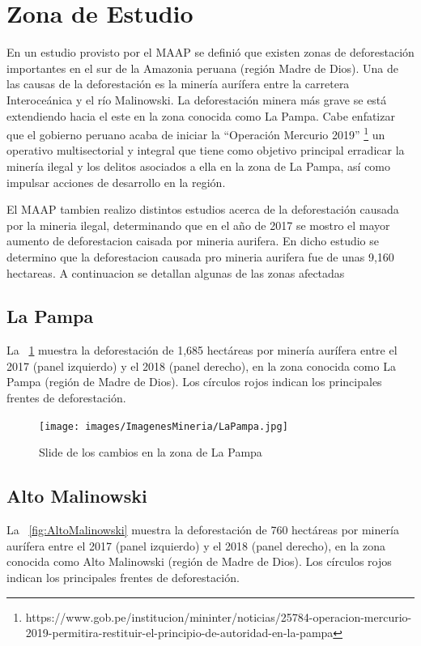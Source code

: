 \section{Zona de Estudio}
En un estudio provisto por el \gls{MAAP} se definió que existen zonas de deforestación importantes en el sur de la Amazonia peruana (región Madre de Dios). Una de las causas de la deforestación es la minería aurífera entre la carretera Interoceánica y el río Malinowski. La deforestación minera más grave se está extendiendo hacia el este en la zona conocida como La Pampa. Cabe enfatizar que el gobierno peruano acaba de iniciar la “Operación Mercurio 2019” \footnote{https://www.gob.pe/institucion/mininter/noticias/25784-operacion-mercurio-2019-permitira-restituir-el-principio-de-autoridad-en-la-pampa} un operativo multisectorial y integral que tiene como objetivo principal erradicar la minería ilegal y los delitos asociados a ella en la zona de La Pampa, así como impulsar acciones de desarrollo en la región.

El \gls{MAAP}  tambien realizo distintos estudios acerca de la deforestación  causada por la mineria ilegal, determinando que en el año de 2017 se mostro el mayor aumento de deforestacion caisada por mineria aurifera. En dicho estudio se determino que la deforestacion causada pro mineria aurifera fue de unas 9,160 hectareas. A continuacion se detallan algunas de las zonas afectadas 
\subsection{La Pampa}
La \figurename~\ref{fig:LaPampa} muestra la deforestación de 1,685 hectáreas por minería aurífera entre el 2017 (panel izquierdo) y el 2018 (panel derecho), en la zona conocida como La Pampa (región de Madre de Dios). Los círculos rojos indican los principales frentes de deforestación.

\begin{figure}[H]
    \centering
    \texttt{[image: images/ImagenesMineria/LaPampa.jpg]}
        \caption{Slide de los cambios en la zona de La Pampa}

    \label{fig:LaPampa}
\end{figure}
\subsection{ Alto Malinowski}

La \figurename~\ref{fig:AltoMalinowski}  muestra la deforestación de 760 hectáreas por minería aurífera entre el 2017 (panel izquierdo) y el 2018 (panel derecho), en la zona conocida como Alto Malinowski (región de Madre de Dios). Los círculos rojos indican los principales frentes de deforestación.



